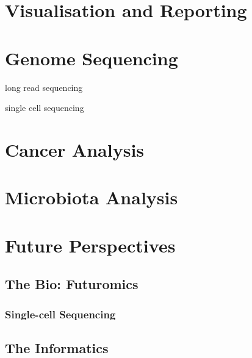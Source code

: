 \section{Visualisation and Reporting}

\section{Genome Sequencing}

long read sequencing

single cell sequencing

\section{Cancer Analysis}

\section{Microbiota Analysis}


\section{Future Perspectives}
\subsection{The Bio: Futuromics}

\subsubsection{Single-cell Sequencing}

\subsection{The Informatics}
\begin{comment}
- bigger better more RAM/CPU to keep up with the ever increasing data sizes, cloudification
- make it usable - the biologists have the knowledge for interpretation, software should be
  usable by them, not just bioinformaticians, Galaxy/docker/conda etc helps with this
- make it maintainable as developers by adhering to coding best-practices and through the
  use of continuous integration strategies>
- training is vital, the more complex these data and methods get, the harder it will be to
  draw accurate conclusions>
- quantum computing? blockchain? the future or just hype?
\end{comment}

